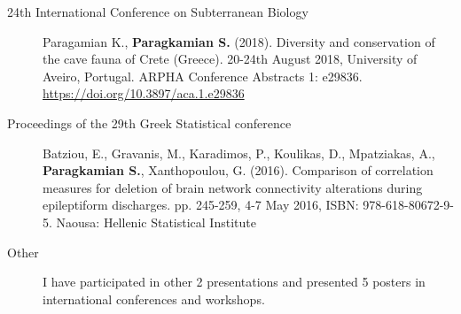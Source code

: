 \begin{description}
\item[24th International Conference on Subterranean Biology] Paragamian K., \textbf{Paragkamian S.} (2018). Diversity and conservation of the cave fauna of Crete (Greece). 20-24th August 2018, University of Aveiro, Portugal. ARPHA Conference Abstracts 1: e29836. \url{https://doi.org/10.3897/aca.1.e29836}
  
  
  
    \item[Proceedings of the 29th Greek Statistical conference] Batziou, E., Gravanis, M., Karadimos, P., Koulikas, D., Mpatziakas, A., \textbf{Paragkamian S.}, Xanthopoulou, G. (2016). Comparison of correlation measures for deletion of brain network connectivity alterations during epileptiform discharges. pp. 245-259, 4-7 May 2016, ISBN: 978-618-80672-9-5. Naousa: Hellenic Statistical Institute

\item[Other] I have participated in other 2 presentations and presented 5 posters in international conferences and workshops.

\end{description}

\begin{refsection}
\nocite{*}
\printbibliography[keyword=own,title={My published works}]
\end{refsection}
